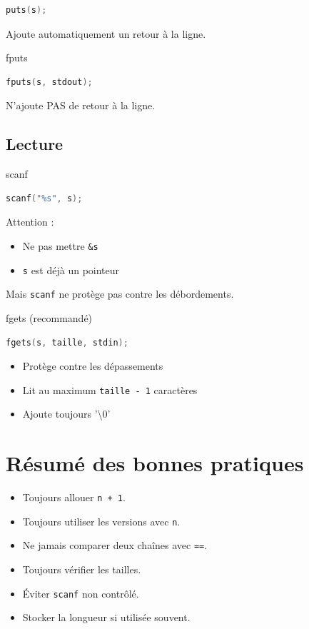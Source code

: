 \begin{lstlisting}[language=C]
puts(s);
\end{lstlisting}

Ajoute automatiquement un retour à la ligne.

fputs

\begin{lstlisting}[language=C]
fputs(s, stdout);
\end{lstlisting}

N’ajoute PAS de retour à la ligne.

\subsection{Lecture}

scanf

\begin{lstlisting}[language=C]
scanf("%s", s);
\end{lstlisting}

Attention :

\begin{itemize}
    \item Ne pas mettre \texttt{\&s}
    \item \texttt{s} est déjà un pointeur
\end{itemize}

Mais \texttt{scanf} ne protège pas contre les débordements.

fgets (recommandé)

\begin{lstlisting}[language=C]
fgets(s, taille, stdin);
\end{lstlisting}

\begin{itemize}
    \item Protège contre les dépassements
    \item Lit au maximum \texttt{taille - 1} caractères
    \item Ajoute toujours '\textbackslash 0'
\end{itemize}

\section{Résumé des bonnes pratiques}

\begin{itemize}
    \item Toujours allouer \texttt{n + 1}.
    \item Toujours utiliser les versions avec \texttt{n}.
    \item Ne jamais comparer deux chaînes avec \texttt{==}.
    \item Toujours vérifier les tailles.
    \item Éviter \texttt{scanf} non contrôlé.
    \item Stocker la longueur si utilisée souvent.
\end{itemize}

